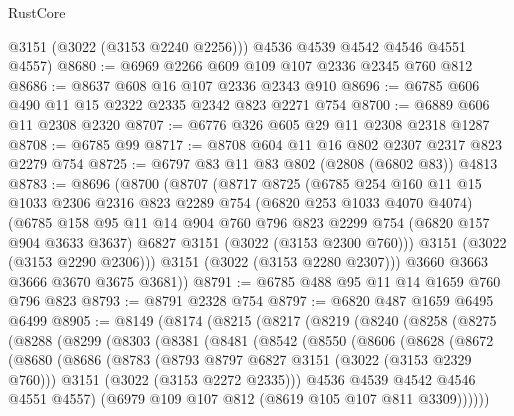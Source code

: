 \begin{lexlean}{RustCore}
\begin{coremodule}
        @3151
        (@3022 (@3153 @2240 @2256)))
      @4536
      @4539
      @4542
      @4546
      @4551
      @4557)
@8680 := @6969 @2266 @609 @109 @107 @2336 @2345 @760 @812
@8686 := @8637 @608 @16 @107 @2336 @2343 @910
@8696 := @6785 @606 @490 @11 @15 @2322 @2335 @2342 @823 @2271 @754
@8700 := @6889 @606 @11 @2308 @2320
@8707 := @6776 @326 @605 @29 @11 @2308 @2318 @1287
@8708 := @6785 @99
@8717 := @8708 @604 @11 @16 @802 @2307 @2317 @823 @2279 @754
@8725 := @6797 @83 @11 @83 @802 (@2808 (@6802 @83)) @4813
@8783 := @8696
    (@8700
      (@8707
        (@8717
          @8725
          (@6785
            @254
            @160
            @11
            @15
            @1033
            @2306
            @2316
            @823
            @2289
            @754
            (@6820 @253 @1033 @4070 @4074)
            (@6785
              @158
              @95
              @11
              @14
              @904
              @760
              @796
              @823
              @2299
              @754
              (@6820 @157 @904 @3633 @3637)
              @6827
              @3151
              (@3022 (@3153 @2300 @760)))
            @3151
            (@3022 (@3153 @2290 @2306)))
          @3151
          (@3022 (@3153 @2280 @2307)))
        @3660
        @3663
        @3666
        @3670
        @3675
        @3681))
@8791 := @6785 @488 @95 @11 @14 @1659 @760 @796 @823
@8793 := @8791 @2328 @754
@8797 := @6820 @487 @1659 @6495 @6499
@8905 := @8149
    (@8174
      (@8215
        (@8217
          (@8219
            (@8240
              (@8258
                (@8275
                  (@8288
                    (@8299
                      (@8303
                        (@8381
                          (@8481
                            (@8542
                              (@8550
                                (@8606
                                  (@8628
                                    (@8672
                                      (@8680
                                        (@8686
                                          (@8783
                                            (@8793 @8797 @6827 @3151 (@3022 (@3153 @2329 @760)))
                                            @3151
                                            (@3022 (@3153 @2272 @2335)))
                                          @4536
                                          @4539
                                          @4542
                                          @4546
                                          @4551
                                          @4557)
                                        (@6979 @109 @107 @812 (@8619 @105 @107 @811 @3309))))))

\end{coremodule}
\end{lexlean}
